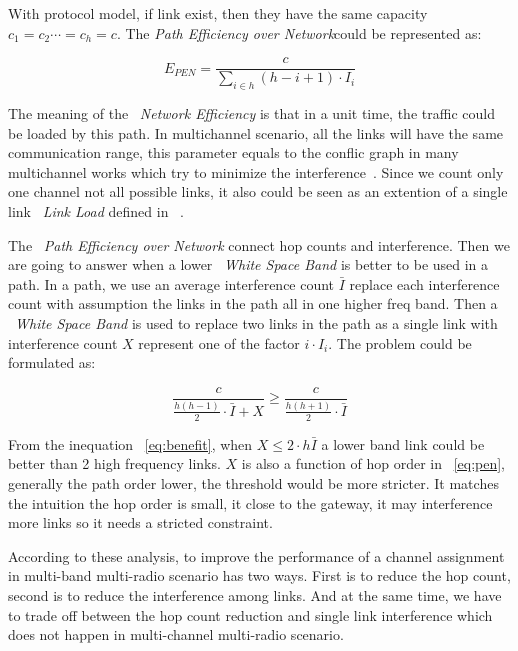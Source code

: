 With protocol model, if link exist, then they have the same capacity $c_1=c_2 \cdots =c_h=c$. 
The \emph{Path Efficiency over Network}could be represented as:


\begin{equation}
\label{eq:pen}
E_{PEN}=\frac{c}{\sum_{i \in h} (h-i+1)\cdot I_i}
\end{equation}
 

The meaning of the ~\emph{Network Efficiency} is that in a unit time, the traffic could be loaded by this path. 
In multichannel scenario, all the links will have the same communication range, this parameter equals to the conflic graph in many multichannel works which try to minimize the interference~\cite{jain2005impact}. 
Since we count only one channel not all possible links, it also could be seen as an extention of a single link ~\emph{Link Load} defined in ~\cite{raniwala2004centralized}.

The ~\emph{Path Efficiency over Network} connect hop counts and interference. 
Then we are going to answer when a lower ~\emph{White Space Band} is better to be used in a path.
In a path, we use an average interference count $\bar{I}$ replace each interference count with assumption the links in the path all in one higher freq band. Then a ~\emph{White Space Band} is used to replace two links in the path as a single link with interference count $X$ represent one of the factor $i\cdot I_i$. The problem could be formulated as:

 
\begin{equation}
\label{eq:benefit}
\frac{c}{\frac{h(h-1)}{2}\cdot \bar{I}+X} \geq \frac{c}{\frac{h(h+1)}{2}\cdot \bar{I}}
\end{equation}

From the inequation ~\ref{eq:benefit}, when $X \leq 2\cdot h\bar{I}$ a lower band link could be better than 2 high frequency links. $X$ is also a function of hop order in ~\ref{eq:pen}, generally the path order lower, the threshold would be more stricter. It matches the intuition the hop order is small, it close to the gateway, it may interference more links so it needs a stricted constraint.

According to these analysis, to improve the performance of a channel assignment in multi-band multi-radio scenario has two ways. First is to reduce the hop count, second is to reduce the interference among links. And at the same time, we have to trade off between the hop count reduction and single link interference which does not happen in multi-channel multi-radio scenario.



